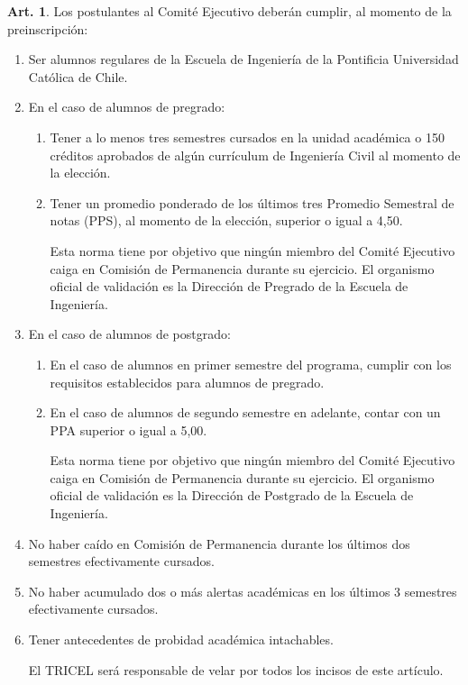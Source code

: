 \documentclass[letterpaper,11pt]{article}
\theoremstyle{definition}%
\newtheorem{art}{Art.} %
\begin{document}
\begin{art}\label{requisitosEjecutivo}
	Los postulantes al Comité Ejecutivo deberán cumplir, al momento de la preinscripción:
	\begin{enumerate}
		\item Ser alumnos regulares de la Escuela de Ingeniería de la Pontificia Universidad Católica de Chile.
		\item En el caso de alumnos de pregrado:
		      \begin{enumerate}
			      \item Tener a lo menos tres semestres cursados en la unidad académica o 150 créditos aprobados de algún currículum de Ingeniería Civil al momento de la elección.

			      \item Tener un promedio ponderado de los últimos tres Promedio Semestral de notas (PPS), al momento de la elección, superior o igual a 4,50.

			            Esta norma tiene por objetivo que ningún miembro del Comité Ejecutivo caiga en Comisión de Permanencia durante su ejercicio. El organismo oficial de validación es la Dirección de Pregrado de la Escuela de Ingeniería.
		      \end{enumerate}
		\item En el caso de alumnos de postgrado:
		      \begin{enumerate}
			      \item En el caso de alumnos en primer semestre del programa, cumplir con los requisitos establecidos para alumnos de pregrado.
			      \item En el caso de alumnos de segundo semestre en adelante, contar con un PPA superior o igual a 5,00.

			            Esta norma tiene por objetivo que ningún miembro del Comité Ejecutivo caiga en Comisión de Permanencia durante su ejercicio. El organismo oficial de validación es la Dirección de Postgrado de la Escuela de Ingeniería.
		      \end{enumerate}

		\item No haber caído en Comisión de Permanencia durante los últimos dos semestres efectivamente cursados.

		\item No haber acumulado dos o más alertas académicas en los últimos 3 semestres efectivamente cursados.

		\item Tener antecedentes de probidad académica intachables.

		      El TRICEL será responsable de velar por todos los incisos de este artículo.
	\end{enumerate}
\end{art}
\end{document}
